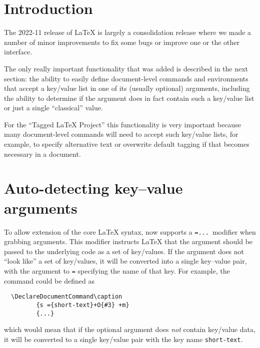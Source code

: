 \documentclass{ltnews}
\providecommand\tubcommand[1]{}
\begin{document}
\tubcommand{\addtolength\textheight{4.2pc}}   %

\maketitle
{  \spaceskip=3.33pt 
\tableofcontents}

\setlength{}


\medskip


\section{Introduction}

The 2022-11 release of \LaTeX{} is largely a consolidation release
where we made a number of minor improvements to fix some bugs or
improve one or the other interface.

The only really important functionality that was added is described in
the next section: the ability to easily define document-level commands
and environments that accept a key/value list in one of its (usually
optional) arguments, including the ability to determine if the argument
does in fact contain such a key/value list or just a single
\enquote{classical} value.

For the \enquote{Tagged \LaTeX{} Project} this functionality is very
important because many document-level commands will need to accept
such key/value lists, for example, to specify alternative text or
overwrite default tagging if that becomes necessary in a document.


\section{Auto-detecting key--value arguments}

To allow extension of the core \LaTeX{} syntax,  now supports
a \texttt{={...}}\ modifier when grabbing arguments. This modifier instructs
\LaTeX{} that the argument should be passed to the underlying code as
a set of key/values. If the argument does not \enquote{look like} a set
of key/values, it will be converted into a single key--value pair, with
the argument to \texttt{=} specifying the name of that key. For
example, the  command could be defined as
\begin{verbatim}
  \DeclareDocumentCommand\caption
         {s ={short-text}+O{#3} +m}
         {...}
\end{verbatim}
which would mean that if the optional argument does \emph{not}
contain key/value data, it will be converted to a single key/value
pair with the key name \texttt{short-text}.
\end{document}

